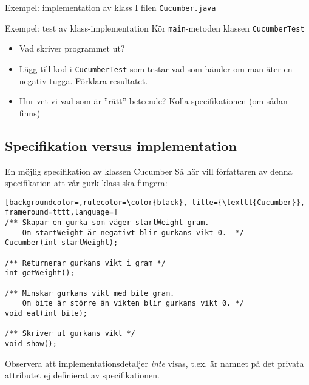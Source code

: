 \documentclass{lecturenotes}
\begin{document}
\begin{Slide}{Exempel: implementation av klass}
\scriptsize I filen \texttt{Cucumber.java}

\end{Slide}

\begin{Slide}{Exempel: test av klass-implementation}
\scriptsize Kör \texttt{main}-metoden klassen \texttt{CucumberTest} 

\begin{itemize}
\item Vad skriver programmet ut?
\item Lägg till kod i \texttt{CucumberTest} som testar vad som händer om man äter en negativ tugga. Förklara resultatet.
\item Hur vet vi vad som är ''rätt'' beteende? \pause Kolla specifikationen (om sådan finns)
\end{itemize}
\end{Slide}

\subsection{Specifikation versus implementation}
\begin{Slide}{En möjlig specifikation av klassen Cucumber}
\footnotesize Så här vill författaren av denna specifikation att vår gurk-klass ska fungera:
\begin{lstlisting}[backgroundcolor=,rulecolor=\color{black}, title={\texttt{Cucumber}}, frameround=tttt,language=]
/** Skapar en gurka som väger startWeight gram. 
    Om startWeight är negativt blir gurkans vikt 0.  */
Cucumber(int startWeight);

/** Returnerar gurkans vikt i gram */
int getWeight();

/** Minskar gurkans vikt med bite gram. 
    Om bite är större än vikten blir gurkans vikt 0. */
void eat(int bite);

/** Skriver ut gurkans vikt */
void show();
\end{lstlisting}
Observera att implementationsdetaljer \textit{inte} visas, t.ex. är namnet på det privata attributet ej definierat av specifikationen.
\end{Slide}
\end{document}
